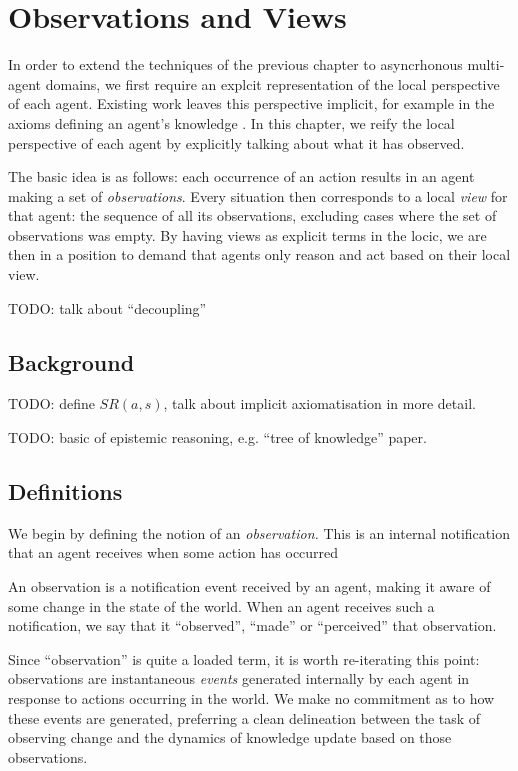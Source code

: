 

\chapter{Observations and Views}

\label{ch:observations}

In order to extend the techniques of the previous chapter to asyncrhonous
multi-agent domains, we first require an explcit representation of
the local perspective of each agent. Existing work leaves this perspective
implicit, for example in the axioms defining an agent's knowledge
\citep{scherl03sc_knowledge,Lesperance99sitcalc_approach}. In this
chapter, we reify the local perspective of each agent by explicitly
talking about what it has observed.

The basic idea is as follows: each occurrence of an action results
in an agent making a set of \emph{observations}. Every situation then
corresponds to a local \emph{view} for that agent: the sequence of
all its observations, excluding cases where the set of observations
was empty. By having views as explicit terms in the locic, we are
then in a position to demand that agents only reason and act based
on their local view.

TODO: talk about {}``decoupling''


\section{Background}

TODO: define $SR(a,s)$, talk about implicit axiomatisation in more
detail.

TODO: basic of epistemic reasoning, e.g. {}``tree of knowledge''
paper.


\section{Definitions}

We begin by defining the notion of an \emph{observation.} This is
an internal notification that an agent receives when some action has
occurred

\begin{defnL}
[{Observations}] An observation is a notification event received
by an agent, making it aware of some change in the state of the world.
When an agent receives such a notification, we say that it {}``observed'',
{}``made'' or {}``perceived'' that observation. 
\end{defnL}
Since {}``observation'' is quite a loaded term, it is worth re-iterating
this point: observations are instantaneous \emph{events} generated
internally by each agent in response to actions occurring in the world.
We make no commitment as to how these events are generated, preferring
a clean delineation between the task of observing change and the dynamics
of knowledge update based on those observations.

